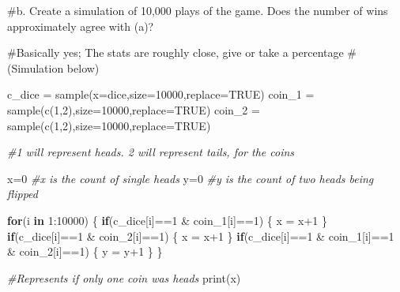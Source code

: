 \documentclass[
]{article}
\newenvironment{Shaded}{\begin{snugshade}}{\end{snugshade}}
\newcommand{\AttributeTok}[1]{\textcolor[rgb]{0.77,0.63,0.00}{#1}}
\newcommand{\CommentTok}[1]{\textcolor[rgb]{0.56,0.35,0.01}{\textit{#1}}}
\newcommand{\ConstantTok}[1]{\textcolor[rgb]{0.00,0.00,0.00}{#1}}
\newcommand{\ControlFlowTok}[1]{\textcolor[rgb]{0.13,0.29,0.53}{\textbf{#1}}}
\newcommand{\DecValTok}[1]{\textcolor[rgb]{0.00,0.00,0.81}{#1}}
\newcommand{\FunctionTok}[1]{\textcolor[rgb]{0.00,0.00,0.00}{#1}}
\newcommand{\NormalTok}[1]{#1}
\newcommand{\OtherTok}[1]{\textcolor[rgb]{0.56,0.35,0.01}{#1}}
\newcommand{\SpecialCharTok}[1]{\textcolor[rgb]{0.00,0.00,0.00}{#1}}
\begin{document}
\#b. Create a simulation of 10,000 plays of the game. Does the number of
wins approximately agree with (a)?

\#Basically yes; The stats are roughly close, give or take a percentage
\#(Simulation below)

\begin{Shaded}
\begin{Highlighting}[]
\NormalTok{c\_dice }\OtherTok{=} \FunctionTok{sample}\NormalTok{(}\AttributeTok{x=}\NormalTok{dice,}\AttributeTok{size=}\DecValTok{10000}\NormalTok{,}\AttributeTok{replace=}\ConstantTok{TRUE}\NormalTok{)}
\NormalTok{coin\_1 }\OtherTok{=} \FunctionTok{sample}\NormalTok{(}\FunctionTok{c}\NormalTok{(}\DecValTok{1}\NormalTok{,}\DecValTok{2}\NormalTok{),}\AttributeTok{size=}\DecValTok{10000}\NormalTok{,}\AttributeTok{replace=}\ConstantTok{TRUE}\NormalTok{)}
\NormalTok{coin\_2 }\OtherTok{=} \FunctionTok{sample}\NormalTok{(}\FunctionTok{c}\NormalTok{(}\DecValTok{1}\NormalTok{,}\DecValTok{2}\NormalTok{),}\AttributeTok{size=}\DecValTok{10000}\NormalTok{,}\AttributeTok{replace=}\ConstantTok{TRUE}\NormalTok{)}

\CommentTok{\#1 will represent heads. 2 will represent tails, for the coins}

\NormalTok{x}\OtherTok{=}\DecValTok{0} \CommentTok{\#x is the count of single heads}
\NormalTok{y}\OtherTok{=}\DecValTok{0} \CommentTok{\#y is the count of two heads being flipped}

\ControlFlowTok{for}\NormalTok{(i }\ControlFlowTok{in} \DecValTok{1}\SpecialCharTok{:}\DecValTok{10000}\NormalTok{)}
\NormalTok{\{}
  \ControlFlowTok{if}\NormalTok{(c\_dice[i]}\SpecialCharTok{==}\DecValTok{1} \SpecialCharTok{\&}\NormalTok{ coin\_1[i]}\SpecialCharTok{==}\DecValTok{1}\NormalTok{)}
\NormalTok{  \{}
\NormalTok{    x }\OtherTok{=}\NormalTok{ x}\SpecialCharTok{+}\DecValTok{1}
\NormalTok{  \}}
  \ControlFlowTok{if}\NormalTok{(c\_dice[i]}\SpecialCharTok{==}\DecValTok{1} \SpecialCharTok{\&}\NormalTok{ coin\_2[i]}\SpecialCharTok{==}\DecValTok{1}\NormalTok{)}
\NormalTok{  \{}
\NormalTok{    x }\OtherTok{=}\NormalTok{ x}\SpecialCharTok{+}\DecValTok{1}
\NormalTok{  \}}
    \ControlFlowTok{if}\NormalTok{(c\_dice[i]}\SpecialCharTok{==}\DecValTok{1} \SpecialCharTok{\&}\NormalTok{ coin\_1[i]}\SpecialCharTok{==}\DecValTok{1} \SpecialCharTok{\&}\NormalTok{ coin\_2[i]}\SpecialCharTok{==}\DecValTok{1}\NormalTok{)}
\NormalTok{  \{}
\NormalTok{    y }\OtherTok{=}\NormalTok{ y}\SpecialCharTok{+}\DecValTok{1}
\NormalTok{  \}}
\NormalTok{\}}

\CommentTok{\#Represents if only one coin was heads}
\FunctionTok{print}\NormalTok{(x)}
\end{Highlighting}
\end{Shaded}
\end{document}

